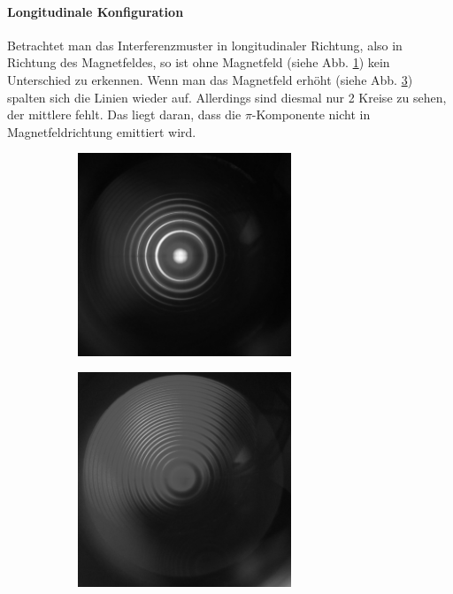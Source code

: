 \paragraph{Longitudinale Konfiguration}
Betrachtet man das Interferenzmuster in longitudinaler Richtung, also in Richtung des Magnetfeldes, so ist ohne Magnetfeld (siehe Abb. \ref{fig:bildlongohneB}) kein Unterschied zu erkennen. Wenn man das Magnetfeld erhöht (siehe Abb. \ref{fig:bildlongmitB}) spalten sich die Linien wieder auf. Allerdings sind diesmal nur 2 Kreise zu sehen, der mittlere fehlt. Das liegt daran, dass die $\pi$-Komponente nicht in Magnetfeldrichtung emittiert wird.

\begin{figure}[h]
  \centering
  \begin{subfigure}[h]{0.5\textwidth}
    \centering
    \includegraphics[width=0.7\textwidth]{data/bilder_okular/bild_5_edit.jpg}
    \label{fig:bildlongohneB}
  \end{subfigure}%
  \begin{subfigure}[h]{0.5\textwidth}
    \centering
    \includegraphics[width=0.7\textwidth]{data/bilder_okular/bild_6_edit.jpg}
    \label{fig:bildlongmitB}
  \end{subfigure}
  \caption{}
\end{figure}

